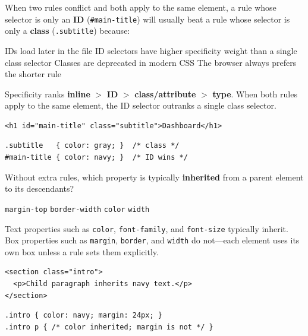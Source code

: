 \question[4]
When two rules conflict and both apply to the same element, a rule whose selector is only an \textbf{ID} (\texttt{\#main-title}) will usually beat a rule whose selector is only a \textbf{class} (\texttt{.subtitle}) because:
\begin{choices}
  \choice IDs load later in the file
  \CorrectChoice ID selectors have higher specificity weight than a single class selector
  \choice Classes are deprecated in modern CSS
  \choice The browser always prefers the shorter rule
\end{choices}
\begin{solution}
  Specificity ranks \textbf{inline} $>$ \textbf{ID} $>$ \textbf{class/attribute} $>$ \textbf{type}. When both rules apply to the same element, the ID selector outranks a single class selector.
\begin{lstlisting}[style=htmlinline]
<h1 id="main-title" class="subtitle">Dashboard</h1>
\end{lstlisting}
\begin{lstlisting}[style=cssinline]
.subtitle   { color: gray; }  /* class */
#main-title { color: navy; }  /* ID wins */
\end{lstlisting}
\end{solution}

\question[4]
Without extra rules, which property is typically \textbf{inherited} from a parent element to its descendants?
\begin{choices}
  \choice \texttt{margin-top}
  \choice \texttt{border-width}
  \CorrectChoice \texttt{color}
  \choice \texttt{width}
\end{choices}
\begin{solution}
  Text properties such as \texttt{color}, \texttt{font-family}, and \texttt{font-size} typically inherit. Box properties such as \texttt{margin}, \texttt{border}, and \texttt{width} do not---each element uses its own box unless a rule sets them explicitly.
\begin{lstlisting}[style=htmlinline]
<section class="intro">
  <p>Child paragraph inherits navy text.</p>
</section>
\end{lstlisting}
\begin{lstlisting}[style=cssinline]
.intro { color: navy; margin: 24px; }
.intro p { /* color inherited; margin is not */ }
\end{lstlisting}
\end{solution}

\newpage


